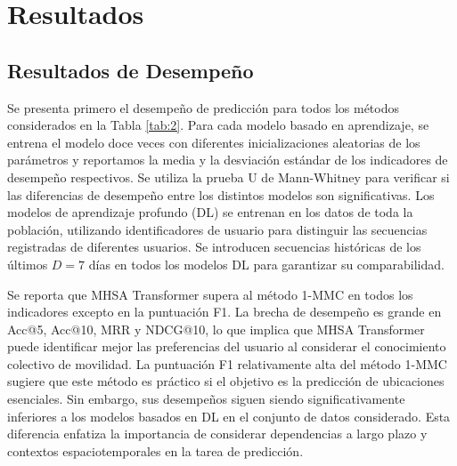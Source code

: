 \section{Resultados}


\subsection{Resultados de Desempe\~no}

\begin{table}[h]
    \centering
    \caption{Resultados de evaluación del rendimiento para la predicción de la próxima ubicación 
    sobre el conjunto de datos Geolife. Se reporta el promedio y la desviación estándar 
    en 12 ejecuciones diferentes.}
    \label{tab:2}
\end{table}




Se presenta primero el desempe\~no de predicci\'on para todos los 
m\'etodos considerados en la Tabla \ref{tab:2}. Para cada modelo basado en 
aprendizaje, se entrena el modelo doce veces con diferentes 
inicializaciones aleatorias de los par\'ametros y reportamos 
la media y la desviaci\'on est\'andar de los indicadores de 
desempe\~no respectivos. Se utiliza la prueba U de Mann-Whitney para 
verificar si las diferencias de desempe\~no entre los distintos modelos 
son significativas. Los modelos de aprendizaje profundo (DL) se 
entrenan en los datos de toda la poblaci\'on, utilizando identificadores 
de usuario para distinguir las secuencias registradas de diferentes usuarios. 
Se introducen secuencias hist\'oricas de los \'ultimos $D = 7$ d\'ias en 
todos los modelos DL para garantizar su comparabilidad.

Se reporta que MHSA Transformer supera al m\'etodo 1-MMC en todos los indicadores 
excepto en la puntuaci\'on F1. La brecha de desempe\~no es grande en 
Acc@5, Acc@10, MRR y NDCG@10, lo que implica que MHSA Transformer puede identificar 
mejor las preferencias del usuario al considerar el conocimiento 
colectivo de movilidad. La puntuaci\'on F1 relativamente alta del 
m\'etodo 1-MMC sugiere que este m\'etodo es pr\'actico si el objetivo es 
la predicci\'on de ubicaciones esenciales. Sin embargo, sus 
desempe\~nos siguen siendo significativamente inferiores a los modelos 
basados en DL en el conjunto de datos considerado. Esta diferencia 
enfatiza la importancia de considerar dependencias a largo plazo y 
contextos espaciotemporales en la tarea de predicci\'on.

